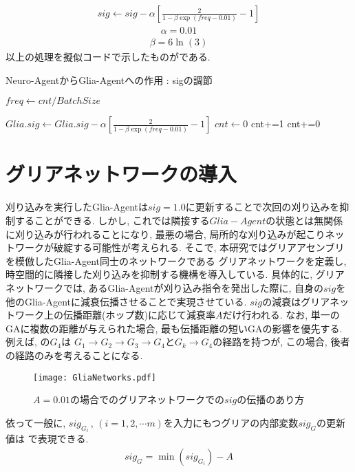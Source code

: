\begin{align}
  sig\leftarrow sig-\alpha\left[\frac{2}{1-\beta\exp(freq-0.01)}-1\right]
  \label{eq:feed}
\end{align}
\begin{align}
  \alpha=0.01  
  \label{eq:feed_param1}
\end{align}
\begin{align}
  \beta=6\ln(3)
  \label{eq:feed_param2}
\end{align}
以上の処理を擬似コードで示したものがである.
\begin{algorithm}[H]
  \caption{Neuro-AgentからGlia-Agentへの作用\,\,:\,\,sigの調節}
  \label{alg:tis2}
  \begin{algorithmic}[1]
  
        \State $freq\gets cnt/BatchSize$

        \State $Glia.sig\gets Glia.sig-\displaystyle\alpha\left[\frac{2}{1-\beta\exp(freq-0.01)}-1\right]$
        \EndIf
        \State $cnt\gets 0$
        \EndIf
          \State cnt+=1
          \Else
          \State cnt+=0 
         \EndIf 
  \EndFunction
  \end{algorithmic}
  \end{algorithm}
\section{グリアネットワークの導入}
刈り込みを実行したGlia-Agentは$sig=1.0$に更新することで次回の刈り込みを抑制することができる.
しかし, これでは隣接する$Glia-Agent$の状態とは無関係に刈り込みが行われることになり, 
最悪の場合, 局所的な刈り込みが起こりネットワークが破綻する可能性が考えられる.
そこで, 本研究ではグリアアセンブリを模倣したGlia-Agent同士のネットワークである
グリアネットワークを定義し, 
時空間的に隣接した刈り込みを抑制する機構を導入している.
具体的に, グリアネットワークでは, あるGlia-Agentが刈り込み指令を発出した際に, 
自身の$sig$を他のGlia-Agentに減衰伝播させることで実現させている.
$sig$の減衰はグリアネットワーク上の伝播距離(ホップ数)に応じて減衰率$A$だけ行われる.
なお, 単一のGAに複数の距離が与えられた場合, 最も伝播距離の短いGAの影響を優先する.
例えば, の$G_4$は 
$G_1\rightarrow G_2\rightarrow G_3\rightarrow G_4$と$G_k\rightarrow G_4$の経路を持つが, 
この場合, 後者の経路のみを考えることになる.
\begin{figure}[H]
  \centering
  \texttt{[image: GliaNetworks.pdf]}
  \caption{$A=0.01$の場合でのグリアネットワークでの$sig$の伝播のあり方}
  \label{fig:GliaNetworks}
\end{figure}
依って一般に, $sig_{G_i}\,,\,(i=1,2,\cdots m)$を入力にもつグリアの内部変数$sig_G$の更新値は
で表現できる.
\begin{align}
  sig_{G}=\min(sig_{G_i})-A
  \label{eq:tt}
\end{align}
